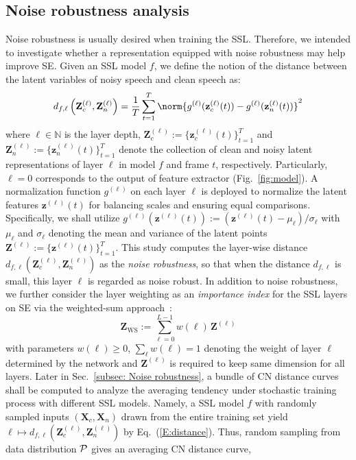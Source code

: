 \documentclass[a4paper]{article}
\begin{document}
\subsection{Noise robustness analysis}\label{subsec:Noise robustness analysis}
Noise robustness is usually desired when training the SSL. Therefore, we intended to investigate whether a representation equipped with noise robustness may help improve SE. Given an SSL model $f$, we define the notion of the distance between the latent variables of noisy speech and clean speech as:
\begin{equation}\label{E:distance}
d_{f, \ell} \left( \mathbf{Z}^{(\ell)}_c,  \mathbf{Z}^{(\ell)}_n \right) = \frac{1}{T} \sum_{t=1}^T \norm{ g^{(\ell)}(\mathbf{z}^{(\ell)}_c(t)) - g^{(\ell)}(\mathbf{z}^{(\ell)}_n(t)) }^2
\end{equation}
where $\ell \in \mathbb{N}$ is the layer depth, $\mathbf{Z}^{(\ell)}_c  := \{ \mathbf{z}^{(\ell)}_c (t) \}_{t=1}^T $ and $\mathbf{Z}^{(\ell)}_n := \{ \mathbf{z}^{(\ell)}_n (t)\}_{t=1}^T $ denote the collection of clean and noisy latent representations of layer $\ell$ in model $f$ and frame $t$, respectively. Particularly, $\ell=0$ corresponds to the output of feature extractor (Fig.~\ref{fig:model}). A normalization function $g^{(\ell)}$ on each layer $\ell$ is deployed to normalize the latent features $\mathbf{z}^{(\ell)}(t)$ for balancing scales and ensuring equal comparisons. Specifically, we shall utilize $g^{(\ell)}(\mathbf{z}^{(\ell)}(t)) := (\mathbf{z}^{(\ell)}(t) - \mu_{\ell}) / \sigma_{\ell}$ with $\mu_{\ell}$ and $\sigma_{\ell}$ denoting the mean and variance of the latent points $\mathbf{Z}^{(\ell)} := \{ \mathbf{z}^{(\ell)}(t) \}_{t=1}^T$. This study computes the layer-wise distance $d_{f, \ell}( \mathbf{Z}^{(\ell)}_c,  \mathbf{Z}^{(\ell)}_n )$ as the \emph{noise robustness}, so that when the distance $d_{f, \ell}$ is small, this layer $\ell$ is regarded as noise robust. In addition to noise robustness, we further consider the layer weighting as an \textit{importance index} for the SSL layers on SE via the weighted-sum approach~\cite{yang2021superb}:
\begin{equation}\label{E:weightedsum}
\mathbf{Z}_{\text{WS}} := \sum_{\ell=0}^{L-1}w(\ell)\, \mathbf{Z}^{(\ell)}
\end{equation}
with parameters $w(\ell) \geq 0 $, $ \sum_{\ell} w(\ell) = 1$ denoting the weight of layer $\ell$ determined by the network and $\mathbf{Z}^{(\ell)}$ is required to keep same dimension for all layers. Later in Sec.~\ref{subsec: Noise robustness}, a bundle of CN distance curves shall be computed to analyze the averaging tendency under stochastic training process with different SSL models. Namely, a SSL model $f$ with randomly sampled inputs $(\mathbf{X}_c, \mathbf{X}_n)$ drawn from the entire training set yield $\ell \mapsto d_{f, \ell} ( \mathbf{Z}^{(\ell)}_c,  \mathbf{Z}^{(\ell)}_n )$ by Eq.~(\ref{E:distance}). Thus, random sampling from data distribution $\mathcal{P}$ gives an averaging CN distance curve,
\end{document}
